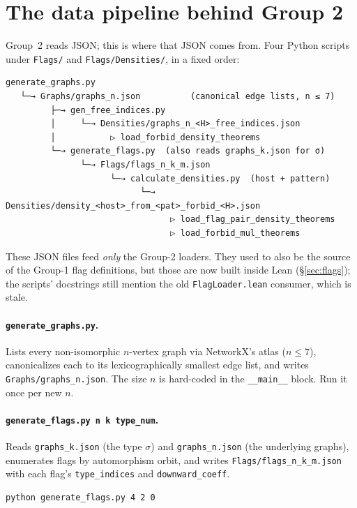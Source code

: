 \documentclass[11pt]{article}
\begin{document}
\section{The data pipeline behind Group 2}
\label{sec:pipeline}

Group~2 reads JSON; this is where that JSON comes from. Four Python
scripts under \texttt{Flags/} and \texttt{Flags/Densities/}, in a fixed
order:

\begin{lstlisting}[language={}]
generate_graphs.py
   └─→ Graphs/graphs_n.json          (canonical edge lists, n ≤ 7)
         ├─→ gen_free_indices.py
         │     └─→ Densities/graphs_n_<H>_free_indices.json
         │           ▷ load_forbid_density_theorems
         └─→ generate_flags.py  (also reads graphs_k.json for σ)
               └─→ Flags/flags_n_k_m.json
                     └─→ calculate_densities.py  (host + pattern)
                           └─→ Densities/density_<host>_from_<pat>_forbid_<H>.json
                                 ▷ load_flag_pair_density_theorems
                                 ▷ load_forbid_mul_theorems
\end{lstlisting}

These JSON files feed \emph{only} the Group-2 loaders. They used to also be
the source of the Group-1 flag definitions, but those are now built inside
Lean (\S\ref{sec:flags}); the scripts' docstrings still mention the old
\texttt{FlagLoader.lean} consumer, which is stale.

\paragraph{\texttt{generate\_graphs.py}.} Lists every non-isomorphic
$n$-vertex graph via NetworkX's atlas ($n \le 7$), canonicalizes each to
its lexicographically smallest edge list, and writes
\texttt{Graphs/graphs\_n.json}. The size $n$ is hard-coded in the
\texttt{\_\_main\_\_} block. Run it once per new $n$.

\paragraph{\texttt{generate\_flags.py n k type\_num}.} Reads
\texttt{graphs\_k.json} (the type $\sigma$) and \texttt{graphs\_n.json} (the
underlying graphs), enumerates flags by automorphism orbit, and writes
\texttt{Flags/flags\_n\_k\_m.json} with each flag's
\texttt{type\_indices} and \texttt{downward\_coeff}.
\begin{lstlisting}[language={}]
python generate_flags.py 4 2 0
\end{lstlisting}
\end{document}
